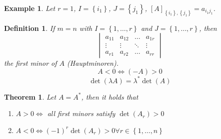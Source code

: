 \documentclass{article}
\newcounter{lecref}[section]
\numberwithin{lecref}{section}
\newtheorem{theorem}[lecref]{Theorem}
\newtheorem{example}[lecref]{Example}
\newtheorem{definition}[lecref]{Definition}
\newcommand{\set}[1]{\left\{#1\right\}}
\begin{document}
\begin{example}
  Let $r = 1$, $I = \set{i_1}$, $J = \set{j_1}$, $[A]_{\set{i_1}, \set{j_1}}  = a_{i_1 j_1}$.
\end{example}

\begin{definition}
  If $m=n$ with $I = \set{1, \ldots, r}$ and $J = \set{1, \ldots, r}$, then
  \[
    \begin{vmatrix}
      a_{11} & a_{12} & \ldots & a_{1r} \\
      \vdots & \vdots & \ddots & \vdots \\
      a_{r1} & a_{r2} & \ldots & a_{rr}
    \end{vmatrix}
  \]
  the first minor of $A$ (\foreignlanguage{german}{Hauptminoren}).
  \[ A < 0 \iff (-A) > 0 \]
  \[ \det(\lambda A) = \lambda^* \det(A) \]
\end{definition}

\begin{theorem} %
  Let $A = A^*$, then it holds that
  \begin{enumerate}
    \item $A > 0 \iff$ all first minors satisfy $\det(A_r) > 0$
    \item $A < 0 \iff (-1)^r \det(A_r) > 0 \forall r \in \set{1, \ldots, n}$
  \end{enumerate}
\end{theorem}
\end{document}
